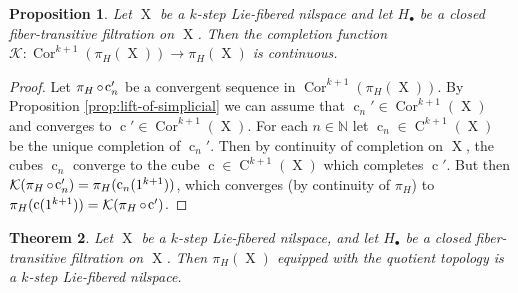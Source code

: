 \documentclass[a4paper,12pt,reqno]{amsart}
\newtheorem{theorem}{Theorem}[section]
\newtheorem{proposition}[theorem]{Proposition}
\theoremstyle{definition}
\def\to{\rightarrow}
\newcommand{\mc}{\mathcal}
\newcommand{\mb}{\mathbb}
\DeclareMathOperator{\q}{c}
\DeclareMathOperator{\ns}{X}
\DeclareMathOperator{\co}{\circ\hspace{-0.02 cm}}
\DeclareMathOperator{\cu}{C}
\DeclareMathOperator{\cor}{Cor}
\begin{document}
\begin{proposition}\label{prop:cont-completion-coset}
Let $\ns$ be a $k$-step Lie-fibered nilspace and let $H_\bullet$ be a closed fiber-transitive filtration on $\ns$. Then the completion function $\mc{K}:\cor^{k+1}(\pi_H(\ns))\to \pi_H(\ns)$ is continuous.
\end{proposition}

\begin{proof}
Let $\pi_H\co\q_n'$ be a convergent sequence in $\cor^{k+1}(\pi_H(\ns))$. By Proposition \ref{prop:lift-of-simplicial} we can assume that $\q_n'\in \cor^{k+1}(\ns)$ and  converges to $\q'\in \cor^{k+1}(\ns)$. For each $n\in \mb{N}$ let $\q_n\in \cu^{k+1}(\ns)$ be the unique completion of $\q_n'$. Then by continuity of completion on $\ns$, the cubes $\q_n$ converge to the cube $\q\in\cu^{k+1}(\ns)$ which completes $\q'$. But then $\mc{K}(\pi_H\co\q_n')=\pi_H(\q_n(1^{k+1}))$, which converges (by continuity of $\pi_H$) to $\pi_H(\q(1^{k+1}))=\mc{K}(\pi_H\co \q')$.
\end{proof}

\begin{theorem}\label{thm:coset-quot-closed}
Let $\ns$ be a $k$-step Lie-fibered nilspace, and let $H_\bullet$ be a closed fiber-transitive filtration on $\ns$. Then $\pi_H(\ns)$ equipped with the quotient topology is a $k$-step  Lie-fibered nilspace.
\end{theorem}
\end{document}
